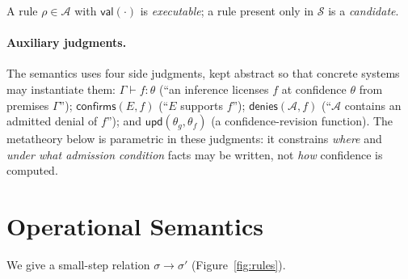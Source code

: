 \documentclass[11pt]{article}
\theoremstyle{plain}
\theoremstyle{definition}
\newcommand{\Aut}{\mathcal{A}}
\newcommand{\Soft}{\mathcal{S}}
\newcommand{\St}{\sigma}
\newcommand{\val}{\mathsf{val}}
\newcommand{\reduces}{\longrightarrow}
\newcommand{\confff}{\theta}
\begin{document}
A rule $\rho\in\Aut$ with $\val(\cdot)$ is \emph{executable}; a rule present only
in $\Soft$ is a \emph{candidate}.

\paragraph{Auxiliary judgments.} The semantics uses four side judgments, kept
abstract so that concrete systems may instantiate them: $\Gamma \vdash f : \confff$
(``an inference licenses $f$ at confidence $\confff$ from premises $\Gamma$'');
$\mathsf{confirms}(E,f)$ (``$E$ supports $f$''); $\mathsf{denies}(\Aut,f)$
(``$\Aut$ contains an admitted denial of $f$''); and
$\mathsf{upd}(\confff_g,\confff_f)$ (a confidence-revision function). The
metatheory below is parametric in these judgments: it constrains \emph{where} and
\emph{under what admission condition} facts may be written, not \emph{how}
confidence is computed.

\section{Operational Semantics}
\label{sec:sem}

We give a small-step relation $\St \reduces \St'$ (Figure~\ref{fig:rules}).
\end{document}

